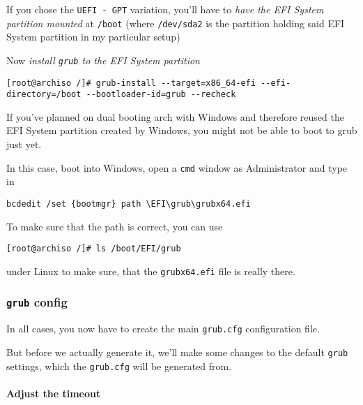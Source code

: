 \documentclass[10pt]{dustdoc}
\begin{document}
If you chose the \texttt{UEFI - GPT} variation, you’ll have to \emph{have the EFI System partition mounted} at \texttt{/boot} (where \texttt{/dev/sda2} is the partition holding said EFI System partition in my particular setup)

Now \emph{install \texttt{grub} to the EFI System partition}

\begin{verbatim}
[root@archiso /]# grub-install --target=x86_64-efi --efi-directory=/boot --bootloader-id=grub --recheck
\end{verbatim}

\begin{IMPORTANT}
    If you’ve planned on dual booting arch with Windows and therefore reused the EFI System partition created by Windows, you might not be able to boot to grub just yet.

    In this case, boot into Windows, open a \texttt{cmd} window as Administrator and type in

    \begin{verbatim}
bcdedit /set {bootmgr} path \EFI\grub\grubx64.efi
    \end{verbatim}

    To make sure that the path is correct, you can use

    \begin{verbatim}
[root@archiso /]# ls /boot/EFI/grub
    \end{verbatim}

    \noindent
    under Linux to make sure, that the \texttt{grubx64.efi} file is really there.
\end{IMPORTANT}

\subsubsection{\texttt{grub} config}
\label{sec:grub-config}

In all cases, you now have to create the main \texttt{grub.cfg} configuration file.

But before we actually generate it, we’ll make some changes to the default \texttt{grub} settings, which the \texttt{grub.cfg} will be generated from.

\paragraph{Adjust the timeout}
\label{par:adjust-the-timeout}
\end{document}
